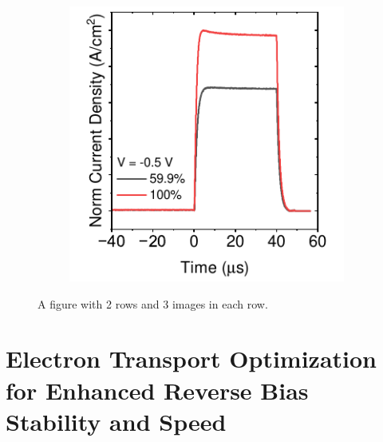 \begin{figure}[htbp]
\begin{subfigure}[b]{0.28\textwidth}
        \caption{}
    \end{subfigure}
    \hfill
    \begin{subfigure}[b]{0.28\textwidth}
        \centering
        \includegraphics[width=\textwidth]{chapters/material_properties/images/tpc-12CsBr.pdf}
        \caption{}
    \end{subfigure}

    \caption{A figure with 2 rows and 3 images in each row.}
    \label{fig:two_rows_three_columns}
\end{figure}


\section{Electron Transport Optimization for Enhanced Reverse Bias Stability and Speed}



